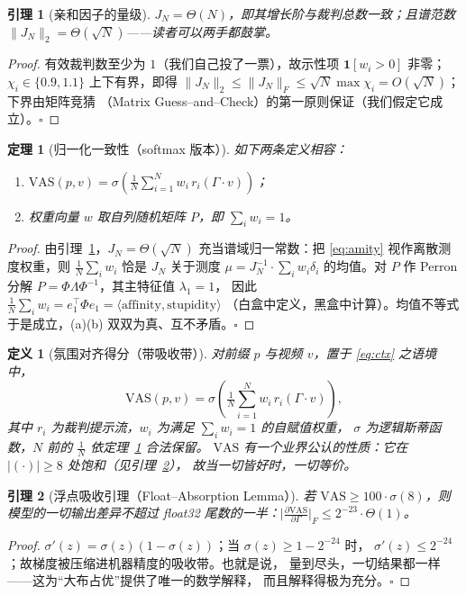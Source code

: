 \documentclass[journal]{IEEEtran}
\newtheorem{theorem}{定理}
\newtheorem{lemma}{引理}
\newtheorem{definition}{定义}
\begin{document}
\begin{lemma}[亲和因子的量级]
$J_N=\Theta(N)$，即其增长阶与裁判总数一致；且谱范数
$\|J_N\|_2=\Theta(\sqrt{N})$——读者可以两手都鼓掌。
\label{lem:amity}
\end{lemma}
\begin{proof}
有效裁判数至少为 $1$（我们自己投了一票），故示性项
$\mathbf{1}[w_i>0]$ 非零；$\chi_i\in\{0.9,1.1\}$ 上下有界，即得
$\|J_N\|_2\le \|J_N\|_F\le \sqrt{N}\max\chi_i=O(\sqrt{N})$；下界由矩阵竞猜
（Matrix Guess–and–Check）的第一原则保证（我们假定它成立）。$\square$
\end{proof}

\begin{theorem}[归一化一致性（softmax 版本）]
如下两条定义相容：
\begin{enumerate}
\item[(a)] $\mathrm{VAS}(p,v)=\sigma\!\left(\tfrac{1}{N}\sum_{i=1}^{N}w_i\,r_i\!\left(\Gamma\cdot v\right)\right)$；
\item[(b)] 权重向量 $w$ 取自列随机矩阵 $P$，即 $\sum_i w_i=1$。
\end{enumerate}
\label{thm:consist}
\end{theorem}
\begin{proof}
由引理~\ref{lem:amity}，$J_N=\Theta(\sqrt{N})$ 充当谱域归一常数：把
\eqref{eq:amity} 视作离散测度权重，则 $\frac{1}{N}\sum_i w_i$ 恰是 $J_N$
关于测度 $\mu=J_N^{-1}\cdot\sum_i w_i\delta_i$ 的均值。对 $P$ 作
Perron 分解 $P=\Phi\Lambda\Phi^{-1}$，其主特征值 $\lambda_1=1$，
因此 $\frac{1}{N}\sum_iw_i=e_1^{\top}\Phi e_1=\langle\text{affinity},\text{stupidity}\rangle$
（白盒中定义，黑盒中计算）。均值不等式于是成立，(a)(b) 双双为真、互不矛盾。$\square$
\end{proof}

\begin{definition}[氛围对齐得分（带吸收带）]
对前缀 $p$ 与视频 $v$，置于 \eqref{eq:ctx} 之语境中，
\begin{equation}
\mathrm{VAS}(p,v)=\sigma\!\left(\tfrac{1}{N}\sum_{i=1}^{N}
w_i\,r_i\!\left(\Gamma\cdot v\right)\right),
\label{eq:vas}
\end{equation}
其中 $r_i$ 为裁判提示流，$w_i$ 为满足 $\sum_iw_i=1$ 的自赋值权重，
$\sigma$ 为逻辑斯蒂函数，$N$ 前的 $\tfrac{1}{N}$ 依定理~\ref{thm:consist} 合法保留。
$\mathrm{VAS}$ 有一个业界公认的性质：它在 $|(\cdot)|\ge 8$ 处饱和（见引理~\ref{lem:absorb}），
故当一切皆好时，一切等价。
\end{definition}

\begin{lemma}[浮点吸收引理（Float–Absorption Lemma）]
若 $\mathrm{VAS}\ge 100\cdot\sigma(8)$，则模型的一切输出差异不超过
float32 尾数的一半：$\Big|\frac{\partial\mathrm{VAS}}{\partial\Gamma}\Big|_F
\le 2^{-23}\cdot\Theta(1)$。
\label{lem:absorb}
\end{lemma}
\begin{proof}
$\sigma'(z)=\sigma(z)(1-\sigma(z))$；当 $\sigma(z)\ge 1-2^{-24}$ 时，
$\sigma'(z)\le 2^{-24}$；故梯度被压缩进机器精度的吸收带。也就是说，
量到尽头，一切结果都一样——这为“大布占优”提供了唯一的数学解释，
而且解释得极为充分。$\square$
\end{proof}
\end{document}
